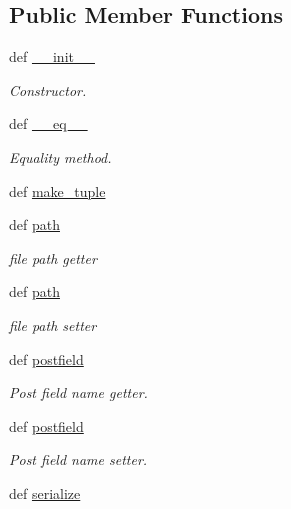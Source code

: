 \subsection*{Public Member Functions}
\begin{DoxyCompactItemize}
\item 
def \hyperlink{classRappCloud_1_1Objects_1_1File_1_1File_a4510832401d723be3c86dba254a7d4af}{\-\_\-\-\_\-init\-\_\-\-\_\-}
\begin{DoxyCompactList}\small\item\em Constructor. \end{DoxyCompactList}\item 
def \hyperlink{classRappCloud_1_1Objects_1_1File_1_1File_a05684bb1596154d2779a184ad57b1916}{\-\_\-\-\_\-eq\-\_\-\-\_\-}
\begin{DoxyCompactList}\small\item\em Equality method. \end{DoxyCompactList}\item 
def \hyperlink{classRappCloud_1_1Objects_1_1File_1_1File_abf1d241f18900d3ba311f91bb978950f}{make\-\_\-tuple}
\item 
def \hyperlink{classRappCloud_1_1Objects_1_1File_1_1File_ad255383d8159eb515edf02afea600939}{path}
\begin{DoxyCompactList}\small\item\em file path getter \end{DoxyCompactList}\item 
def \hyperlink{classRappCloud_1_1Objects_1_1File_1_1File_ad255383d8159eb515edf02afea600939}{path}
\begin{DoxyCompactList}\small\item\em file path setter \end{DoxyCompactList}\item 
def \hyperlink{classRappCloud_1_1Objects_1_1File_1_1File_a3d0593049cfbc11ccc1324b8a12a2ead}{postfield}
\begin{DoxyCompactList}\small\item\em Post field name getter. \end{DoxyCompactList}\item 
def \hyperlink{classRappCloud_1_1Objects_1_1File_1_1File_a3d0593049cfbc11ccc1324b8a12a2ead}{postfield}
\begin{DoxyCompactList}\small\item\em Post field name setter. \end{DoxyCompactList}\item 
def \hyperlink{classRappCloud_1_1Objects_1_1File_1_1File_a42dacd9e3965e63230aa1a879cb1927e}{serialize}
\end{DoxyCompactItemize}
